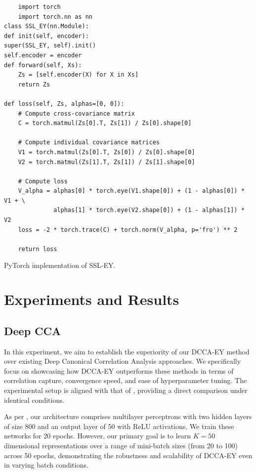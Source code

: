 \begin{listing}[ht]
    \begin{verbatim}
    import torch
    import torch.nn as nn
class SSL_EY(nn.Module):
def init(self, encoder):
super(SSL_EY, self).init()
self.encoder = encoder
def forward(self, Xs):
    Zs = [self.encoder(X) for X in Xs]
    return Zs

def loss(self, Zs, alphas=[0, 0]):
    # Compute cross-covariance matrix
    C = torch.matmul(Zs[0].T, Zs[1]) / Zs[0].shape[0]
    
    # Compute individual covariance matrices
    V1 = torch.matmul(Zs[0].T, Zs[0]) / Zs[0].shape[0]
    V2 = torch.matmul(Zs[1].T, Zs[1]) / Zs[1].shape[0]
    
    # Compute loss
    V_alpha = alphas[0] * torch.eye(V1.shape[0]) + (1 - alphas[0]) * V1 + \
              alphas[1] * torch.eye(V2.shape[0]) + (1 - alphas[1]) * V2
    loss = -2 * torch.trace(C) + torch.norm(V_alpha, p='fro') ** 2
    
    return loss
    \end{verbatim}
    \caption{PyTorch implementation of SSL-EY.}
    \label{lst:pytorch-ssl}
\end{listing}



\section{Experiments and Results}

\subsection{Deep CCA}\label{sec:experiments-DCCA}
In this experiment, we aim to establish the superiority of our DCCA-EY method over existing Deep Canonical Correlation Analysis approaches.
We specifically focus on showcasing how DCCA-EY outperforms these methods in terms of correlation capture, convergence speed, and ease of hyperparameter tuning.
The experimental setup is aligned with that of \citet{wang2015stochastic}, providing a direct comparison under identical conditions.

As per \citet{wang2015stochastic}, our architecture comprises multilayer perceptrons with two hidden layers of size 800 and an output layer of 50 with ReLU activations.
We train these networks for 20 epochs.
However, our primary goal is to learn $K=50$ dimensional representations over a range of mini-batch sizes (from 20 to 100) across 50 epochs, demonstrating the robustness and scalability of DCCA-EY even in varying batch conditions.

